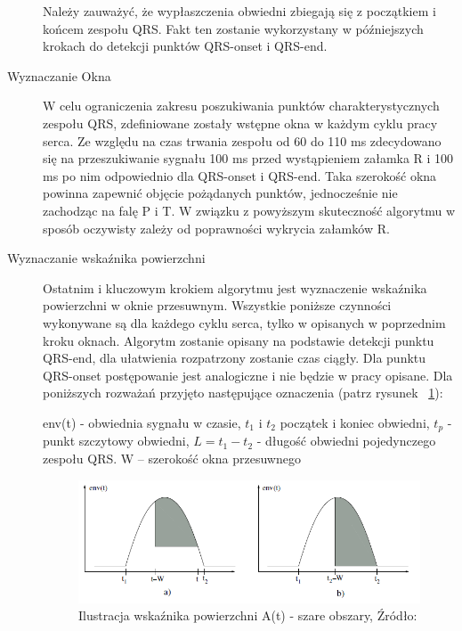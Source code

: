 \begin{description}
Należy zauważyć, że wypłaszczenia obwiedni zbiegają się z początkiem i końcem zespołu QRS. Fakt ten zostanie wykorzystany w późniejszych krokach do detekcji punktów QRS-onset i QRS-end.

\item[Wyznaczanie Okna]
W celu ograniczenia zakresu poszukiwania punktów charakterystycznych zespołu QRS, zdefiniowane zostały wstępne okna w każdym cyklu pracy serca. Ze względu na czas trwania zespołu od 60 do 110 ms zdecydowano się na przeszukiwanie sygnału 100 ms przed wystąpieniem załamka R i 100 ms po nim odpowiednio dla QRS-onset i QRS-end. Taka szerokość okna powinna zapewnić objęcie pożądanych punktów, jednocześnie nie zachodząc na falę P i T. W związku z powyższym skuteczność algorytmu w sposób oczywisty zależy od poprawności wykrycia załamków R.

\item[Wyznaczanie wskaźnika powierzchni]
 Ostatnim i kluczowym krokiem algorytmu jest wyznaczenie wskaźnika powierzchni w oknie przesuwnym. Wszystkie poniższe czynności wykonywane są dla każdego cyklu serca, tylko w opisanych w poprzednim kroku oknach. Algorytm zostanie opisany na podstawie detekcji punktu QRS-end, dla ułatwienia rozpatrzony zostanie czas ciągły. Dla punktu QRS-onset postępowanie jest analogiczne i nie będzie w pracy opisane. Dla poniższych rozważań przyjęto następujące oznaczenia (patrz rysunek ~\ref{fig:Waves_A_t}):


env(t) - obwiednia sygnału w czasie, \newline
$t_1 $ i $t_2$  początek i koniec obwiedni, \newline
$t_p$ - punkt szczytowy obwiedni, \newline
$L = t_{1}-t_{2}$ - długość obwiedni pojedynczego zespołu QRS. \newline
W – szerokość okna przesuwnego

\begin{figure}[h]
\centering
\includegraphics[width=\textwidth,keepaspectratio] {Waves/img/A_t.png}
\caption{Ilustracja wskaźnika powierzchni A(t) - szare obszary, Źródło: \cite{Waves_QRSAlg}}
\label{fig:Waves_A_t}
\end{figure}


\end{description}

